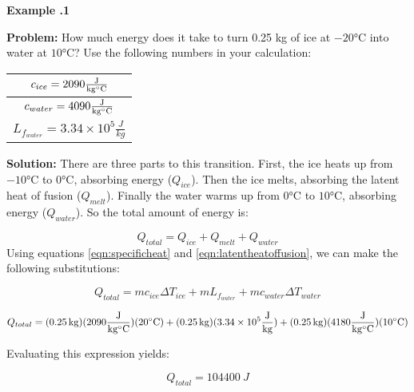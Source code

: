 		
	\begin{mdframed}[backgroundcolor=blue!10!white]
	\begin{center}
		
		
		\textbf{Example \thesection.1}	
	\end{center}
	
	\textbf{Problem: } How much energy does it take to turn 0.25 kg of ice at $-20 \si{\degreeCelsius}$ into water at $10 \si{\degreeCelsius}$?  Use the following numbers in your calculation: 
	\vspace{0.1 in}
	\begin{center}
		

	\begin{tabular}{|c|}
		\hline
			$c_{ice} = 2090 \si{\frac{J}{kg \degreeCelsius}}$ \\
			\hline
			$c_{water} = 4090 \si{\frac{J}{kg \degreeCelsius}}$\\
	\hline
	$L_{f_{water}} = 3.34 \times 10^5 \si{\frac{J}{kg}}$
	\\
	\hline

	\end{tabular}
	\end{center}
	
	\vspace{0.1in}
	
	\textbf{Solution:} There are three parts to this transition.  First, the ice heats up from $-10 \si{\degreeCelsius}$ to $0 \si{\degreeCelsius}$, absorbing energy ($Q_{ice}$).  Then the ice melts, absorbing the latent heat of fusion ($Q_{melt}$).  Finally the water warms up from $0 \si{\degreeCelsius}$ to $10 \si{\degreeCelsius}$, absorbing energy ($Q_{water}$).  So the total amount of energy is:
	
	\begin{equation*}
	Q_{total} = Q_{ice} + Q_{melt} + Q_{water}
	\end{equation*}
	Using equations \ref{eqn:specificheat} and \ref{eqn:latentheatoffusion}, we can make the following substitutions:
	
		\begin{equation*}
		Q_{total} = m c_{ice} \Delta T_{ice} + m L_{f_{water}} + m c_{water} \Delta T_{water} 
	\end{equation*}

	\begin{equation*}
		Q_{total} = (\SI{0.25}{kg})(2090 \si{\frac{J}{kg \degreeCelsius}})(20 \si{\degreeCelsius}) + (\SI{0.25}{kg})(3.34 \times 10^5 \si{\frac{J}{kg}}) + (\SI{0.25}{kg})(4180 \si{\frac{J}{kg \degreeCelsius}})(10 \si{\degreeCelsius}) 
	\end{equation*}

Evaluating this expression yields:

\begin{equation*}
	Q_{total} = \SI{104400}{J}
\end{equation*}
\end{mdframed}

